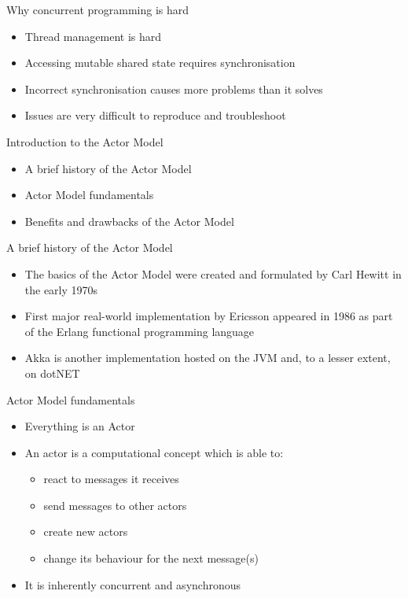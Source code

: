 \documentclass[12pt,xcolor=svgnames]{beamer}
\begin{document}
\begin{frame}{Why concurrent programming is hard	}
\begin{itemize}
\item Thread management is hard	
\item Accessing mutable shared state requires synchronisation
\item Incorrect synchronisation causes more problems than it solves
\item Issues are very difficult to reproduce and troubleshoot
\end{itemize}
	
\end{frame}

\begin{frame}{Introduction to the Actor Model}
\begin{itemize}
\item A brief history of the Actor Model
\item Actor Model fundamentals
\item Benefits and drawbacks of the Actor Model	
\end{itemize}
	
\end{frame}

\begin{frame}{A brief history of the Actor Model}
\begin{itemize}
\item The basics of the Actor Model were created and formulated by Carl Hewitt in the early 1970s
\item First major real-world implementation by Ericsson appeared in 1986 as part of the Erlang functional
programming language	
\item Akka is another implementation hosted on the JVM and, to a lesser extent, on dotNET
\end{itemize}
	
\end{frame}

\begin{frame}{Actor Model fundamentals}
\begin{itemize}
\item Everything is an Actor
\item An actor is a computational concept which is able to:
\begin{itemize}
\item react to messages it receives
\item send messages to other actors
\item create new actors
\item change its behaviour for the next message(s)	
\end{itemize}
\item It is inherently concurrent and asynchronous
\end{itemize}
	
\end{frame}
\end{document}
